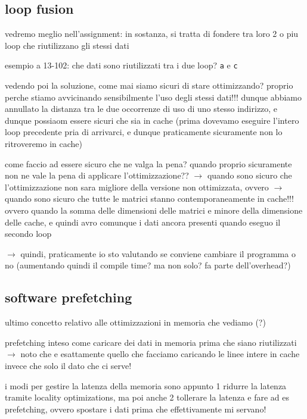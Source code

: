 \subsection{loop fusion}

vedremo meglio nell'assignment: in sostanza, si tratta di fondere tra loro 2 o piu loop che riutilizzano gli stessi dati

esempio a 13-102: che dati sono riutilizzati tra i due loop? \lstinline|a| e \lstinline|c|

vedendo poi la soluzione, come mai siamo sicuri di stare ottimizzando? proprio perche stiamo avvicinando sensibilmente l'uso degli stessi dati!!! dunque abbiamo annullato la distanza tra le due occorrenze di uso di uno stesso indirizzo, e dunque possiaom essere sicuri che sia in cache (prima dovevamo eseguire l'intero loop precedente pria di arrivarci, e dunque praticamente sicuramente non lo ritroveremo in cache)

come faccio ad essere sicuro che ne valga la pena? quando proprio sicuramente non ne vale la pena di applicare l'ottimizzazione?? $\rightarrow$ quando sono sicuro che l'ottimizzazione non sara migliore della versione non ottimizzata, ovvero $\rightarrow$ quando sono sicuro che tutte le matrici stanno contemporaneamente in cache!!! ovvero quando la somma delle dimensioni delle matrici e minore della dimensione delle cache, e quindi avro comunque i dati ancora presenti quando eseguo il secondo loop

$\rightarrow$ quindi, praticamente io sto valutando se conviene cambiare il programma o no (aumentando quindi il compile time? ma non solo? fa parte dell'overhead?)

\subsection{software prefetching}

ultimo concetto relativo alle ottimizzazioni in memoria che vediamo (?)

prefetching inteso come caricare dei dati in memoria prima che siano riutilizzati $\rightarrow$ noto che e esattamente quello che facciamo caricando le linee intere in cache invece che solo il dato che ci serve!

i modi per gestire la latenza della memoria sono appunto 1 ridurre la latenza tramite locality optimizations, ma poi anche 2 tollerare la latenza e fare ad es prefetching, ovvero spostare i dati prima che effettivamente mi servano!

